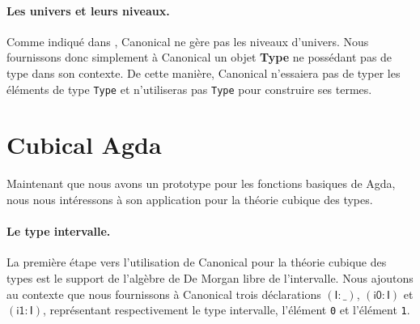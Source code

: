 \documentclass[11pt]{article}
\begin{document}
\paragraph{Les univers et leurs niveaux.}
Comme indiqué dans \cite{norman2025canonical}, Canonical ne gère pas les niveaux d'univers.
Nous fournissons donc simplement à Canonical un objet \textbf{Type} ne possédant pas de type dans son contexte.
De cette manière, Canonical n'essaiera pas de typer les éléments de type \texttt{Type} et n'utiliseras pas \texttt{Type} pour construire ses termes.

\section{Cubical Agda}
Maintenant que nous avons un prototype pour les fonctions basiques de Agda, 
nous nous intéressons à son application pour la théorie cubique des types.

\paragraph{Le type intervalle.}
La première étape vers l'utilisation de Canonical pour la théorie cubique des types est le support de l'algèbre de De Morgan libre de l'intervalle.
Nous ajoutons au contexte que nous fournissons à Canonical trois déclarations $\mathsf{(I : \_)}$, $\mathsf{(i0 : I)}$ et $\mathsf{(i1 : I)}$, 
représentant respectivement le type intervalle, l'élément \texttt{0} et l'élément \texttt{1}. 
\end{document}
